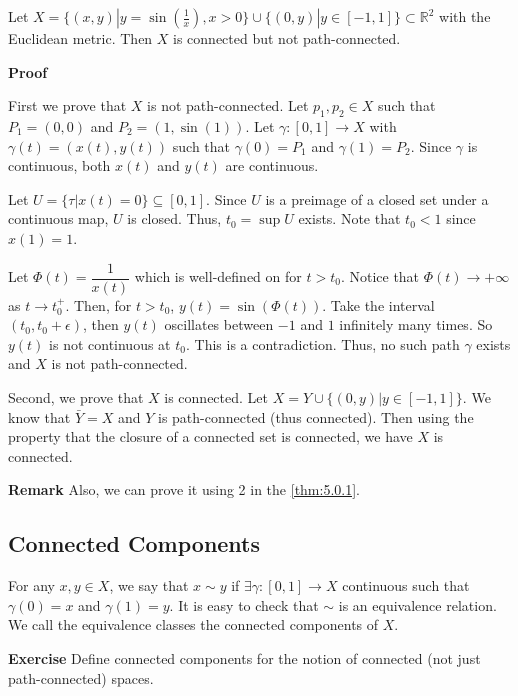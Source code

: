 \documentclass[main.tex]{subfiles}
\begin{document}
\begin{example}
    Let $X = \{(x, y)| y = \sin(\frac{1}{x}), x > 0\} \cup  \{(0, y)| y \in [-1, 1]\} \subset \mathbb{R}^2$ with the Euclidean metric. Then $X$ is connected but not path-connected.
\end{example}
\par \noindent \textbf{Proof} 
\par First we prove that $X$ is not path-connected. Let $p_1, p_2 \in X$ such that $P_1 = (0, 0)$ and $P_2 = (1, \sin(1))$. Let $\gamma: [0,1] \rightarrow X$ with $\gamma(t) = (x(t), y(t))$ such that $\gamma(0) = P_1$ and $\gamma(1) = P_2$. Since $\gamma$ is continuous, both $x(t)$ and $y(t)$ are continuous. 
\par Let $U = \{\tau| x(t) = 0\} \subseteq [0,1]$. Since $U$ is a preimage of a closed set under a continuous map, $U$ is closed. Thus, $t_0 = \sup U$ exists. Note that $t_0 < 1$ since $x(1) = 1$.
\par Let $\varPhi(t) = \dfrac{1}{x(t)}$ which is well-defined on for $t > t_0$. Notice that $\varPhi(t) \rightarrow +\infty$ as $t \rightarrow t_0^+$. Then, for $t > t_0$, $y(t) = \sin(\varPhi(t))$. Take the interval $(t_0, t_0 + \epsilon)$, then $y(t)$ oscillates between $-1$ and $1$ infinitely many times. So $y(t)$ is not continuous at $t_0$. This is a contradiction. Thus, no such path $\gamma$ exists and $X$ is not path-connected.


\par Second, we prove that $X$ is connected. Let $X = Y \cup \{(0, y)| y\in [-1, 1]\}$. We know that $\bar{Y} = X$ and $Y$ is path-connected (thus connected). Then using the property that the closure of a connected set is connected, we have $X$ is connected.

\par \noindent \textbf{Remark} Also, we can prove it using 2 in the \ref{thm:5.0.1}. 

\subsection{Connected Components}
\par For any $x, y\in X$, we say that $x \sim y$ if $\exists \gamma : [0,1] \rightarrow X$ continuous such that $\gamma(0) = x$ and $\gamma(1) = y$. It is easy to check that $\sim$ is an equivalence relation. We call the equivalence classes the connected components of $X$.
\par \noindent \textbf{Exercise} Define connected components for the notion of connected (not just path-connected) spaces. 
\end{document}
